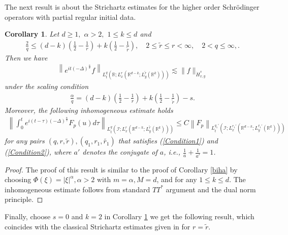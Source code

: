 \documentclass[a4paper,11pt, reqno]{amsart}
\newtheorem{cor}[theorem]{Corollary}
\theoremstyle{definition}
\theoremstyle{remark}
\numberwithin{equation}{section}
\begin{document}
               
               The next result is about the Strichartz estimates for the higher order Schr\"odinger operators with partial regular initial data. 

        \begin{cor} \label{hos} Let $d \geq 1,$ $\alpha>2,$ $1 \leq k \leq d$ and 
        \begin{align}\label{Condition1}
				\frac{2}{q} \leq(d-k)\left(\frac{1}{2}-\frac{1}{r}\right)+k\left(\frac{1}{2}-\frac{1}{\widetilde{r}}\right), \quad 2 \leq \widetilde{r} \leq r<\infty, \quad 2<q \leq \infty,.
			\end{align}
            Then we have
			\begin{align}\label{eq11111}
				\left\|e^{i t (-\Delta)^{\frac{\alpha}{2}}} f\right\|_{L_t^q\left(\mathbb{R} ; L_x^r\left(\mathbb{R}^{d-k} ; L_y^{\tilde{r}}\left(\mathbb{R}^k\right)\right)\right)} \lesssim \|f\|_{\dot{H}_{x, y}^s}
			\end{align}
			under  the scaling condition
			\begin{align}\label{Condition2}
				\frac{{{\alpha}}}{q}=(d-k)\left(\frac{1}{2}-\frac{1}{r}\right)+k\left(\frac{1}{2}-\frac{1}{\widetilde{r}}\right)-s.
			\end{align}
			Moreover,  the  following  inhomogeneous estimate holds
			\begin{align}\label{inhom}
				\left\|\int_0^t e^{i(t-\tau)  (-\Delta)^{\frac{\alpha}{2}}} F_p(u) d \tau\right\|_{L_t^q\left(\mathcal{I} ; L_x^r\left(\mathbb{R}^{d-k} ; L_y^{\tilde{r}}\left(\mathbb{R}^k\right)\right)\right)}  \leq C\left\|F_p\right\|_{L_t^{q_1'}\left(\mathcal{I} ; L_x^{r_1'}\left(\mathbb{R}^{d-k} ; L_y^{\tilde{r_1}'}\left(\mathbb{R}^k\right)\right)\right)}
			\end{align}
			for any pairs $(q, r, \tilde{r}),(q_1, r_1, \tilde{r_1}) $ that satisfies (\ref{Condition1})  and (\ref{Condition2}), where $a'$ denotes the conjugate of $a $, i.e., $\frac{1}{a}+\frac{1}{a'}=1$.
			
      \end{cor}
\begin{proof} The proof of this result is similar to the proof of Corollary \ref{biha} by choosing   $\Phi(\xi)=|\xi|^\alpha, \alpha>2$ with $m=\alpha, M=d$,  and   for any $1 \leq k \leq d.$ The inhomogeneous estimate follows from standard  $TT^*$ argument and the dual norm principle.
\end{proof}
    Finally,   choose $s=0$ and $k=2$ in Corollary \ref{hos} we get the following result, which coincides with the classical Strichartz estimates given in \cite{CHL11} for $r=\tilde{r}$.
         
\end{document}
